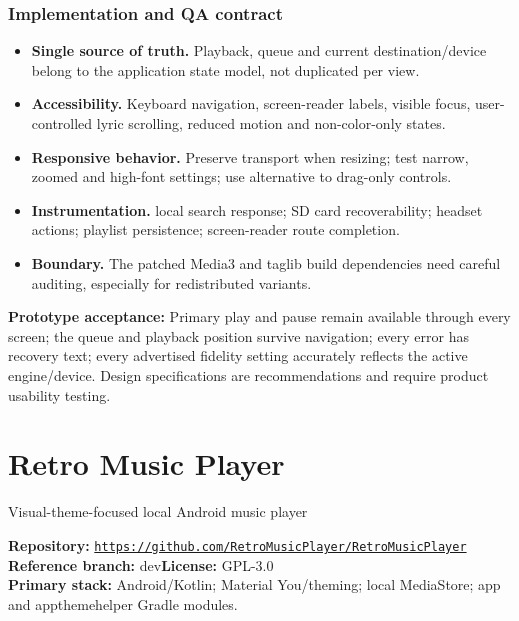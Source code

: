 \documentclass[10pt,a4paper,oneside]{report}
\newcommand{\sourceurl}[1]{\href{#1}{\texttt{\nolinkurl{#1}}}}
\begin{document}
\subsection*{Implementation and QA contract}
\begin{itemize}[leftmargin=*,itemsep=2pt,topsep=2pt]
\item \textbf{Single source of truth.} Playback, queue and current destination/device belong to the application state model, not duplicated per view.
\item \textbf{Accessibility.} Keyboard navigation, screen-reader labels, visible focus, user-controlled lyric scrolling, reduced motion and non-color-only states.
\item \textbf{Responsive behavior.} Preserve transport when resizing; test narrow, zoomed and high-font settings; use alternative to drag-only controls.
\item \textbf{Instrumentation.} local search response; SD card recoverability; headset actions; playlist persistence; screen-reader route completion.
\item \textbf{Boundary.} The patched Media3 and taglib build dependencies need careful auditing, especially for redistributed variants.
\end{itemize}
\vspace{2mm}\begin{evidencebox}\small\textbf{Prototype acceptance:} Primary play and pause remain available through every screen; the queue and playback position survive navigation; every error has recovery text; every advertised fidelity setting accurately reflects the active engine/device. Design specifications are recommendations and require product usability testing.\end{evidencebox}
\clearpage
\chapter{Retro Music Player}
{\large\color{muted}Visual-theme-focused local Android music player}\par
\begin{evidencebox}\small\textbf{Repository:} \sourceurl{https://github.com/RetroMusicPlayer/RetroMusicPlayer}\\\textbf{Reference branch:} dev\qquad \textbf{License:} GPL-3.0\\\textbf{Primary stack:} Android/Kotlin; Material You/theming; local MediaStore; app and appthemehelper Gradle modules.\end{evidencebox}
\end{document}
